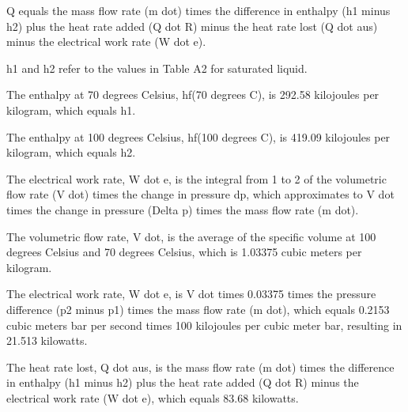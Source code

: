 Q equals the mass flow rate (m dot) times the difference in enthalpy (h1 minus h2) plus the heat rate added (Q dot R) minus the heat rate lost (Q dot aus) minus the electrical work rate (W dot e).

h1 and h2 refer to the values in Table A2 for saturated liquid.

The enthalpy at 70 degrees Celsius, hf(70 degrees C), is 292.58 kilojoules per kilogram, which equals h1.

The enthalpy at 100 degrees Celsius, hf(100 degrees C), is 419.09 kilojoules per kilogram, which equals h2.

The electrical work rate, W dot e, is the integral from 1 to 2 of the volumetric flow rate (V dot) times the change in pressure dp, which approximates to V dot times the change in pressure (Delta p) times the mass flow rate (m dot).

The volumetric flow rate, V dot, is the average of the specific volume at 100 degrees Celsius and 70 degrees Celsius, which is 1.03375 cubic meters per kilogram.

The electrical work rate, W dot e, is V dot times 0.03375 times the pressure difference (p2 minus p1) times the mass flow rate (m dot), which equals 0.2153 cubic meters bar per second times 100 kilojoules per cubic meter bar, resulting in 21.513 kilowatts.

The heat rate lost, Q dot aus, is the mass flow rate (m dot) times the difference in enthalpy (h1 minus h2) plus the heat rate added (Q dot R) minus the electrical work rate (W dot e), which equals 83.68 kilowatts.